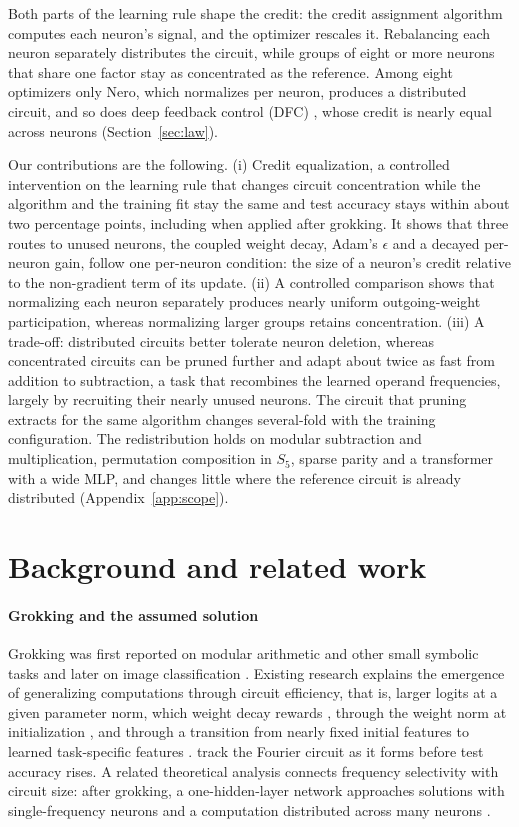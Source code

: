 \documentclass{article} %
\begin{document}
Both parts of the learning rule shape the credit: the credit assignment algorithm computes each neuron's signal, and the optimizer rescales it. Rebalancing each neuron separately distributes the circuit, while groups of eight or more neurons that share one factor stay as concentrated as the reference. Among eight optimizers only Nero, which normalizes per neuron, produces a distributed circuit, and so does deep feedback control (DFC) \citep{meulemans2021dfc}, whose credit is nearly equal across neurons (Section~\ref{sec:law}).

Our contributions are the following. (i) Credit equalization, a controlled intervention on the learning rule that changes circuit concentration while the algorithm and the training fit stay the same and test accuracy stays within about two percentage points, including when applied after grokking. It shows that three routes to unused neurons, the coupled weight decay, Adam's $\epsilon$ and a decayed per-neuron gain, follow one per-neuron condition: the size of a neuron's credit relative to the non-gradient term of its update. (ii) A controlled comparison shows that normalizing each neuron separately produces nearly uniform outgoing-weight participation, whereas normalizing larger groups retains concentration. (iii) A trade-off: distributed circuits better tolerate neuron deletion, whereas concentrated circuits can be pruned further and adapt about twice as fast from addition to subtraction, a task that recombines the learned operand frequencies, largely by recruiting their nearly unused neurons. The circuit that pruning extracts for the same algorithm changes several-fold with the training configuration. The redistribution holds on modular subtraction and multiplication, permutation composition in $S_5$, sparse parity and a transformer with a wide MLP, and changes little where the reference circuit is already distributed (Appendix~\ref{app:scope}).

\section{Background and related work}
\label{sec:background}

\paragraph{Grokking and the assumed solution}
Grokking was first reported on modular arithmetic and other small symbolic tasks \citep{power2022grokking} and later on image classification \citep{liu2022omnigrok}. Existing research explains the emergence of generalizing computations through circuit efficiency, that is, larger logits at a given parameter norm, which weight decay rewards \citep{varma2023circuit}, through the weight norm at initialization \citep{liu2022omnigrok}, and through a transition from nearly fixed initial features to learned task-specific features \citep{kumar2024grokking}. \citet{nanda2023progress} track the Fourier circuit as it forms before test accuracy rises. A related theoretical analysis connects frequency selectivity with circuit size: after grokking, a one-hidden-layer network approaches solutions with single-frequency neurons and a computation distributed across many neurons \citep{morwani2024feature}.
\end{document}
